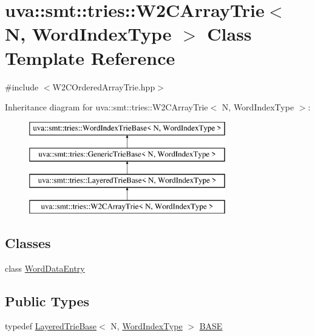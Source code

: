 \hypertarget{classuva_1_1smt_1_1tries_1_1_w2_c_array_trie}{}\section{uva\+:\+:smt\+:\+:tries\+:\+:W2\+C\+Array\+Trie$<$ N, Word\+Index\+Type $>$ Class Template Reference}
\label{classuva_1_1smt_1_1tries_1_1_w2_c_array_trie}


{\ttfamily \#include $<$W2\+C\+Ordered\+Array\+Trie.\+hpp$>$}

Inheritance diagram for uva\+:\+:smt\+:\+:tries\+:\+:W2\+C\+Array\+Trie$<$ N, Word\+Index\+Type $>$\+:\begin{figure}[H]
\begin{center}
\leavevmode
\includegraphics[height=4.000000cm]{classuva_1_1smt_1_1tries_1_1_w2_c_array_trie}
\end{center}
\end{figure}
\subsection*{Classes}
\begin{DoxyCompactItemize}
\item 
class \hyperlink{classuva_1_1smt_1_1tries_1_1_w2_c_array_trie_1_1_word_data_entry}{Word\+Data\+Entry}
\end{DoxyCompactItemize}
\subsection*{Public Types}
\begin{DoxyCompactItemize}
\item 
typedef \hyperlink{classuva_1_1smt_1_1tries_1_1_layered_trie_base}{Layered\+Trie\+Base}$<$ N, \hyperlink{classuva_1_1smt_1_1tries_1_1_word_index_trie_base_a30c4fffe3a3423c87b229b66340dd2f8}{Word\+Index\+Type} $>$ \hyperlink{classuva_1_1smt_1_1tries_1_1_w2_c_array_trie_a9089f2521a6f1972349b497a65afe2a0}{B\+A\+S\+E}
\end{DoxyCompactItemize}
